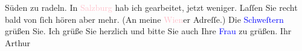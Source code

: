                Süden zu radeln. In \textcolor{pink}{Salzburg}{}\ledrightnote{\textcolor{pink}{Salzburg}} hab ich gearbeitet,
               jetzt weniger. Laſſen Sie recht bald von ſich hören aber mehr. (An meine \textcolor{pink}{Wien}{}\ledrightnote{\textcolor{pink}{Wien}}er Adreſſe.) Die \textcolor{blue}{Schweſtern}{} grüßen Sie. Ich grüße Sie
               herzlich und bitte Sie auch Ihre {\pb}\textcolor{blue}{Frau}{} zu grüßen.\pend
           \pstart
           Ihr{\\}\spacefill\mbox{Arthur}\pend
           \endnumbering{}  
      